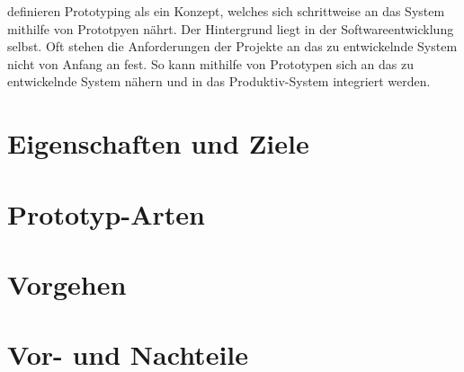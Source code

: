 
\citeauthor{Broy.2013} definieren Prototyping als ein Konzept, welches sich schrittweise an das System mithilfe von Prototpyen nährt. Der Hintergrund liegt in der Softwareentwicklung selbst. Oft stehen die Anforderungen der Projekte an das zu entwickelnde System nicht von Anfang an fest. So kann mithilfe von Prototypen sich an das zu entwickelnde System nähern und in das Produktiv-System integriert werden.





\section{Eigenschaften und Ziele} \label{prot:Eigenschaften}



\section{Prototyp-Arten} \label{prot:Prototyparten}


\section{Vorgehen} \label{prot:Prototyp_vorgehen}


\section{Vor- und Nachteile} \label{prot:Prototyp_vorteile}